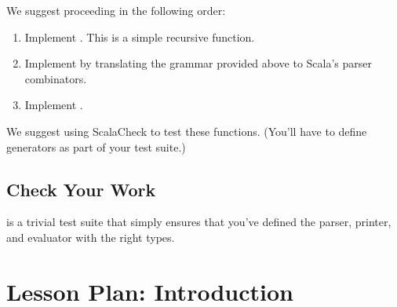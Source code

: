 \documentclass[9pt]{extbook}
\begin{document}
We suggest proceeding in the following order:

\begin{enumerate}

\item Implement . This is a simple recursive function.

\item Implement  by translating the grammar provided above to Scala's parser combinators.

\item Implement .

\end{enumerate}

We suggest using ScalaCheck to test these functions. (You'll have to define generators as part of your test suite.)

\section{Check Your Work}

 is a trivial test suite that simply ensures that you've defined the parser, printer, and evaluator with the right types.




\chapter{Lesson Plan: Introduction}
\end{document}
